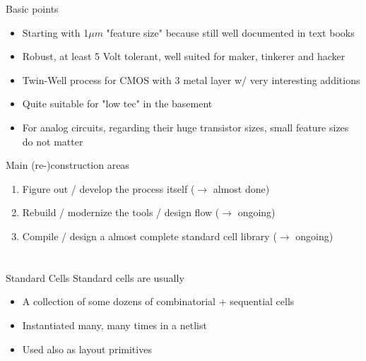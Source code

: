 \documentclass[aspectratio=169]{beamer}
\begin{document}
\begin{frame}{Basic points}
	\begin{itemize}
        \setlength\itemsep{1em}
		\item Starting with 1$\mu m$ "feature size" because still well documented in text books
		\item Robust, at least 5 Volt tolerant, well suited for maker, tinkerer and hacker
		\item Twin-Well process for CMOS with 3 metal layer w/ very interesting additions
		\item Quite suitable for "low tec" in the basement
		\item For analog circuits, regarding their huge transistor sizes, small feature sizes do not matter
	\end{itemize}
\end{frame}

\begin{frame}{Main (re-)construction areas}
	\begin{enumerate}
		\item Figure out / develop the process itself ($\rightarrow$ almost done)
		\item Rebuild / modernize the tools / design flow ($\rightarrow$ ongoing)
		\item Compile / design a almost complete standard cell library ($\rightarrow$ ongoing)
	\end{enumerate}
\end{frame}

\section[Standard cells]{}
\begin{frame}{Standard Cells}
Standard cells are usually
	\begin{itemize}
        \setlength\itemsep{1em}
		\item A collection of some dozens of combinatorial + sequential cells
		\item Instantiated many, many times in a netlist
		\item Used also as layout primitives
	\end{itemize}
\end{frame}
\end{document}
